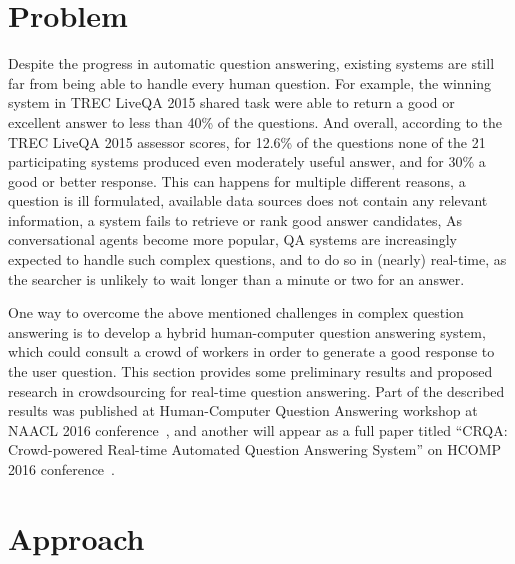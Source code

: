 %

\label{chapter:crowdsourcing}

\noindent

\section{Problem}
\label{section:crowdsourcing:problem}

Despite the progress in automatic question answering, existing systems are still far from being able to handle every human question.
For example, the winning system in TREC LiveQA 2015 shared task were able to return a good or excellent answer to less than 40\% of the questions.
And overall, according to the TREC LiveQA 2015 assessor scores, for 12.6\% of the questions none of the 21 participating systems produced even moderately useful answer, and for 30\% a good or better response.
This can happens for multiple different reasons, \eg a question is ill formulated, available data sources does not contain any relevant information, a system fails to retrieve or rank good answer candidates, \etc
As conversational agents become more popular, QA systems are increasingly expected to handle such complex questions, and to do so in (nearly) real-time, as the searcher is unlikely to wait longer than a minute or two for an answer.

One way to overcome the above mentioned challenges in complex question answering is to develop a hybrid human-computer question answering system, which could consult a crowd of workers in order to generate a good response to the user question.
This section provides some preliminary results and proposed research in crowdsourcing for real-time question answering.
Part of the described results was published at Human-Computer Question Answering workshop at NAACL 2016 conference~\cite{savenkov_crowdsourcing2016a}, and another will appear as a full paper titled ``CRQA: Crowd-powered Real-time Automated Question Answering System'' on HCOMP 2016 conference~\cite{savenkov_crqa2016}.

\section{Approach}
\label{section:crowdsourcing:approach}

